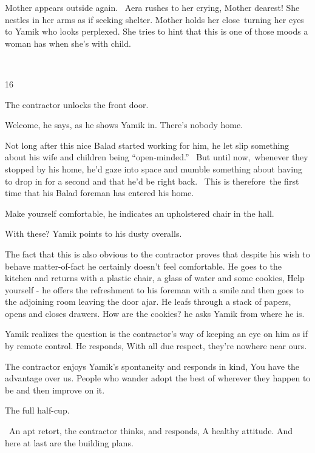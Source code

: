 \documentclass[12pt]{book}
\begin{document}
Mother appears outside again. ~Aera rushes to her crying, {\textquotedbl}Mother dearest!{\textquotedbl} She nestles in
her arms as if seeking shelter. Mother holds her close~turning her eyes to Yamik who looks perplexed. She tries to hint
that this is one of those moods a woman has when she's with child.

~

16

The contractor unlocks the front door.

{\textquotedbl}Welcome,{\textquotedbl} he says, as he shows Yamik in. {\textquotedbl}There's nobody home.{\textquotedbl}


Not long after this nice Balad started working for him, he let slip something about his wife and children being
``open-minded.'' \ But until now,~whenever they stopped by his home, he'd gaze into space and mumble something about
having to drop in for a second and that he'd be right back. ~This is therefore~the first time that his Balad foreman
has entered his home.

{\textquotedbl}Make yourself comfortable,{\textquotedbl} he indicates an upholstered chair in the hall.~

{\textquotedbl}With these?{\textquotedbl} Yamik points to his dusty overalls.

The fact that this is also obvious to the contractor proves that despite his wish to behave matter-of-fact he certainly
doesn't feel comfortable. He goes to the kitchen and returns with a plastic chair, a glass of water and some cookies,
{\textquotedbl}Help yourself - {\textquotedbl} he offers the refreshment to his foreman with a smile and then goes to
the adjoining room leaving the door ajar. He leafs through a stack of papers, opens and closes drawers.
{\textquotedbl}How are the cookies?{\textquotedbl} he asks Yamik from where he is.

Yamik realizes the question is the contractor's way of keeping an eye on him as if by remote control. He responds,
{\textquotedbl}With all due respect, they're nowhere near ours.{\textquotedbl}

The contractor enjoys Yamik's spontaneity and responds in kind, {\textquotedbl}You have the advantage over us. People
who wander adopt the best of wherever they happen to be and then improve on it.{\textquotedbl}

{\textquotedbl}The full half-cup.{\textquotedbl}

~An apt retort, the contractor thinks, and responds, {\textquotedbl}A healthy attitude. And here at last are the
building plans.{\textquotedbl}
\end{document}

